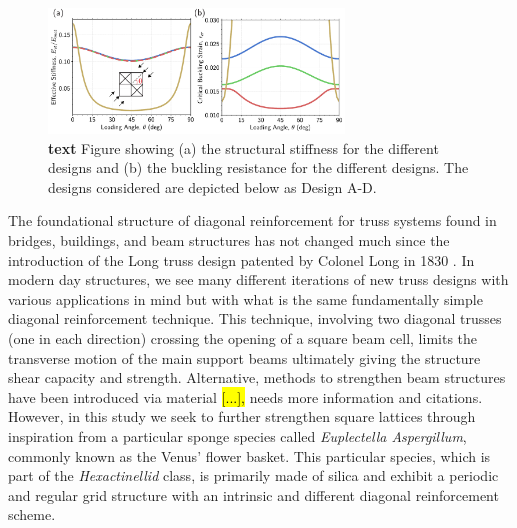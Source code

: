 \documentclass[9pt,twocolumn,twoside]{fernandes_paper}
\newcommand{\mf}[1]{\colorbox{blue!10}{\color{color3}#1}}
\begin{document}
\begin{figure}[ht]
	\captionsetup{width=0.8\textwidth}
	\begin{center}
		\includegraphics[width=0.7\textwidth]{Fig3}
	\end{center}
	\caption{\textbf{text} Figure showing (a) the structural stiffness for the different designs and (b) the buckling resistance for the different designs. The designs considered are depicted below as Design A-D.} \label{Fig3}
\end{figure}




The foundational structure of diagonal reinforcement for truss systems found in bridges, buildings, and beam structures has not changed much since the introduction of the Long truss design patented by Colonel Long in 1830 \citep{waddell1916}. In modern day structures, we see many different iterations of new truss designs with various applications in mind but with what is the same fundamentally simple diagonal reinforcement technique. This technique, involving two diagonal trusses (one in each direction) crossing the opening of a square beam cell, limits the transverse motion of the main support beams ultimately giving the structure shear capacity and strength. Alternative, methods to strengthen beam structures have been introduced via material \hl{[...],} \mf{needs more information and citations}. However, in this study we seek to further strengthen square lattices through inspiration from a particular sponge species called \textit{Euplectella Aspergillum}, commonly known as the Venus' flower basket. This particular species, which is part of the \textit{Hexactinellid} class, is primarily made of silica and exhibit a periodic and regular grid structure with an intrinsic and different diagonal reinforcement scheme.
\end{document}
